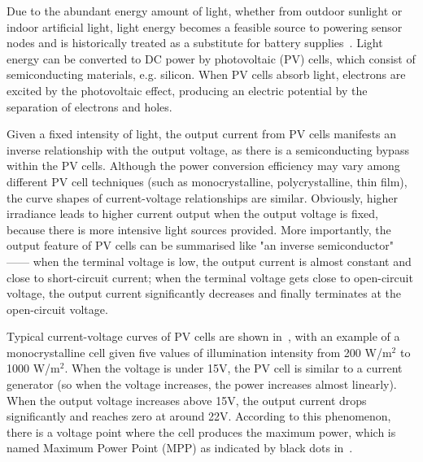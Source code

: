 Due to the abundant energy amount of light, whether from outdoor sunlight or indoor artificial light, light energy becomes a feasible source to powering sensor nodes and is historically treated as a substitute for battery supplies~\cite{raghunathan2005design, seah2009wireless}. Light energy can be converted to DC power by photovoltaic (PV) cells, which consist of semiconducting materials, e.g. silicon. When PV cells absorb light, electrons are excited by the photovoltaic effect, producing an electric potential by the separation of electrons and holes.

Given a fixed intensity of light, the output current from PV cells manifests an inverse relationship with the output voltage, as there is a semiconducting bypass within the PV cells. Although the power conversion efficiency may vary among different PV cell techniques (such as monocrystalline, polycrystalline, thin film), the curve shapes of current-voltage relationships are similar. Obviously, higher irradiance leads to higher current output when the output voltage is fixed, because there is more intensive light sources provided. More importantly, the output feature of PV cells can be summarised like "an inverse semiconductor" ------ when the terminal voltage is low, the output current is almost constant and close to short-circuit current; when the terminal voltage gets close to open-circuit voltage, the output current significantly decreases and finally terminates at the open-circuit voltage. 

Typical current-voltage curves of PV cells are shown in~, with an example of a monocrystalline cell given five values of illumination intensity from 200 W/m$^{2}$ to 1000 W/m$^{2}$. When the voltage is under 15V, the PV cell is similar to a current generator (so when the voltage increases, the power increases almost linearly). When the output voltage increases above 15V, the output current drops significantly and reaches zero at around 22V. According to this phenomenon, there is a voltage point where the cell produces the maximum power, which is named Maximum Power Point (MPP) as indicated by black dots in~. 

